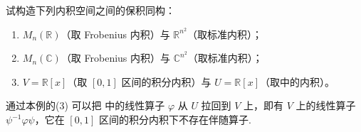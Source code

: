 \documentclass[../../main.tex]{subfiles}%
\begin{document}
\begin{example}\label{example:例9.34}
试构造下列内积空间之间的保积同构：
\begin{enumerate}
\item \(M_n(\mathbb{R})\)（取 Frobenius 内积）与 \(\mathbb{R}^{n^2}\)（取标准内积）；
\item \(M_n(\mathbb{C})\)（取 Frobenius 内积）与 \(\mathbb{C}^{n^2}\)（取标准内积）；
\item \(V = \mathbb{R}[x]\)（取 \([0,1]\) 区间的积分内积）与 \(U = \mathbb{R}[x]\)（取中的内积）。
\end{enumerate}
\end{example}
\begin{remark}
通过本例的(3) 可以把 中的线性算子 \(\varphi\) 从 \(U\) 拉回到 \(V\) 上，即有 \(V\) 上的线性算子 \(\psi^{-1}\varphi\psi\)，它在 \([0,1]\) 区间的积分内积下不存在伴随算子. 
\end{remark}
\end{document}
